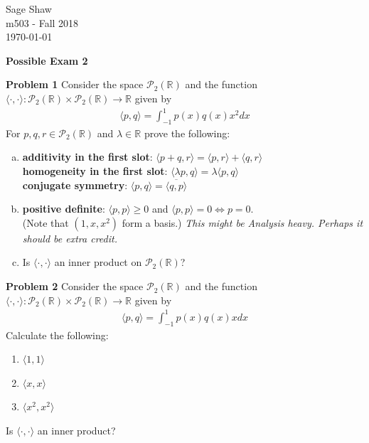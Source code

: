\documentclass[12pt]{article}
\newcommand{\problem}[1]{\hspace{-4 ex} \large \textbf{Problem #1} }
\newcommand{\RR}{\mathbb{R}}
\newcommand{\PP}{\mathcal{P}}
\begin{document}
	\thispagestyle{empty}
	
	\begin{flushright}
		Sage Shaw \\
		m503 - Fall 2018 \\
		\today
	\end{flushright}
	
\begin{center}{\large \textbf{Possible Exam 2}}\end{center}
\bigbreak

\hspace{-.5 ex}\problem{1} Consider the space $\PP_2(\RR)$ and the function $\langle \cdot, \cdot \rangle : \PP_2(\RR) \times \PP_2(\RR) \to \RR$ given by
\begin{align}
\langle p, q \rangle = \int_{-1}^{1} p(x) q(x) x^2 dx\label{inner1}
\end{align}
For $p,q,r \in \PP_2(\RR)$ and $\lambda \in \RR$ prove the following:
\begin{enumerate}[(a)]
	\item \textbf{additivity in the first slot}: $\langle p+q, r \rangle = \langle p,r\rangle + \langle q,r\rangle$ \\
	\textbf{homogeneity in the first slot}: $\langle \lambda p, q \rangle = \lambda \langle p,q\rangle$\\ \textbf{conjugate symmetry}: $\langle p, q \rangle = \overline{\langle q,p\rangle}$ \bigbreak
	
	\item \textbf{positive definite}: $\langle p, p \rangle \geq 0$ and $\langle p, p \rangle=0 \iff p=0$. \\(Note that $(1, x, x^2)$ form a basis.) \textit{This might be Analysis heavy. Perhaps it should be extra credit.}\\
	\item Is $\langle \cdot, \cdot \rangle$ an inner product on $\PP_2(\RR)$?
\end{enumerate}

\pagebreak
\problem{2} Consider the space $\PP_2(\RR)$ and the function $\langle \cdot, \cdot \rangle : \PP_2(\RR) \times \PP_2(\RR) \to \RR$ given by
\begin{align}
\langle p, q \rangle = \int_{-1}^{1} p(x) q(x) x dx\label{inner2}
\end{align}
Calculate the following:
\begin{enumerate}
	\item $\langle 1, 1 \rangle$
	\item $\langle x, x \rangle$
	\item $\langle x^2, x^2 \rangle$
\end{enumerate}
Is $\langle \cdot, \cdot \rangle$ an inner product?
\end{document}
